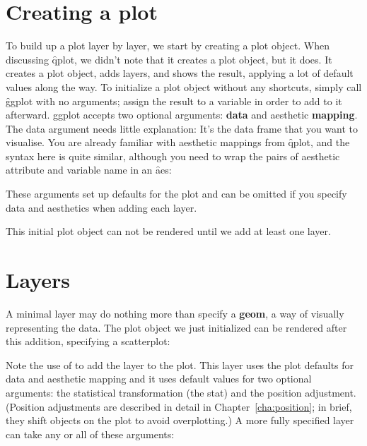 \section{Creating a plot}
\label{sec:ggplot}

To build up a plot layer by layer, we start by creating a plot object. When discussing \f{qplot}, we didn't note that it creates a plot object, but it does. It creates a plot object, adds layers, and shows the result, applying a lot of default values along the way. To initialize a plot object without any shortcuts, simply call \f{ggplot} with no arguments; assign the result to a variable in order to add to it afterward.  ggplot accepts two optional arguments: {\bf data} and aesthetic {\bf mapping}.  The data argument needs little explanation: It's the data frame that you want to visualise.  You are already familiar with aesthetic mappings from \f{qplot}, and the syntax here is quite similar, although you need to wrap the pairs of aesthetic attribute and variable name in an \f{aes}:

% 


These arguments set up defaults for the plot and can be omitted if you specify data and aesthetics when adding each layer. 

This initial plot object can not be rendered until we add at least one layer.

\section{Layers}
\label{sec:layers}

A minimal layer may do nothing more than specify a {\bf geom}, a way of visually representing the data.  The plot object we just initialized can be rendered after this addition, specifying a scatterplot:

% 

\noindent Note the use of \code{+} to add the layer to the plot.  This layer uses the plot defaults for data and aesthetic mapping and it uses default values for two optional arguments: the statistical transformation (the stat) and the position adjustment.  (Position adjustments are described in detail in Chapter~\ref{cha:position}; in brief, they shift objects on the plot to avoid overplotting.)  A more fully specified layer can take any or all of these arguments:

